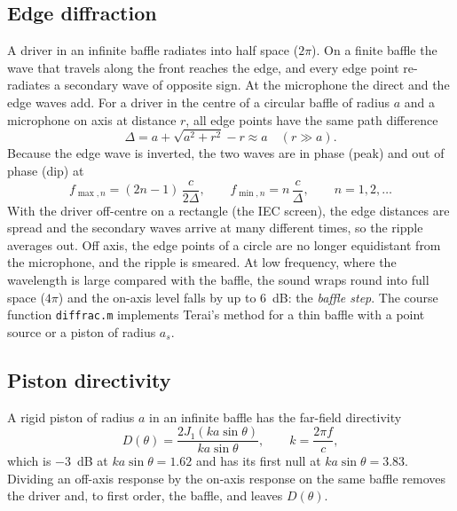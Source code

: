 \documentclass[a4paper,10pt]{article}
\newcommand{\file}[1]{\nolinkurl{#1}}
\begin{document}
\subsection{Edge diffraction}
A driver in an infinite baffle radiates into half space ($2\pi$). On a finite baffle the wave
that travels along the front reaches the edge, and every edge point re-radiates a secondary
wave of opposite sign. At the microphone the direct and the edge waves add. For a driver in the
centre of a circular baffle of radius $a$ and a microphone on axis at distance $r$, all edge
points have the same path difference
\begin{equation}
\Delta = a + \sqrt{a^2 + r^2} - r \approx a \quad (r \gg a).
\end{equation}
Because the edge wave is inverted, the two waves are in phase (peak) and out of phase (dip) at
\begin{equation}
f_{\max,n} = (2n-1)\,\frac{c}{2\Delta}, \qquad f_{\min,n} = n\,\frac{c}{\Delta}, \qquad n = 1,2,\dots
\end{equation}
With the driver off-centre on a rectangle (the IEC screen), the edge distances are spread and the
secondary waves arrive at many different times, so the ripple averages out. Off axis, the edge
points of a circle are no longer equidistant from the microphone, and the ripple is smeared.
At low frequency, where the wavelength is large compared with the baffle, the sound wraps round
into full space ($4\pi$) and the on-axis level falls by up to \SI{6}{dB}: the \emph{baffle step}.
The course function \file{diffrac.m} implements Terai's method for a thin baffle with a point
source or a piston of radius $a_s$.

\subsection{Piston directivity}
A rigid piston of radius $a$ in an infinite baffle has the far-field directivity
\begin{equation}
D(\theta) = \frac{2J_1(ka\sin\theta)}{ka\sin\theta}, \qquad k = \frac{2\pi f}{c},
\end{equation}
which is \SI{-3}{dB} at $ka\sin\theta = 1.62$ and has its first null at $ka\sin\theta = 3.83$.
Dividing an off-axis response by the on-axis response on the same baffle removes the driver and,
to first order, the baffle, and leaves $D(\theta)$.
\end{document}

